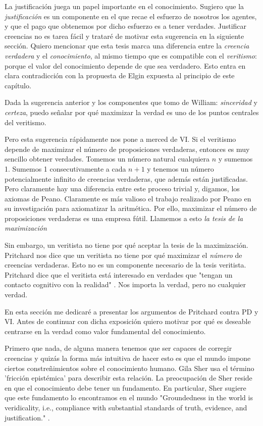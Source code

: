 La justificación juega un papel importante en el conocimiento.
Sugiero que la \emph{justificación} es un componente en el que recae el esfuerzo de nosotros los agentes, y que el pago que obtenemos por dicho esfuerzo es a tener verdades.
Justificar creencias no es tarea fácil y trataré de motivar esta sugerencia en la siguiente sección.
Quiero mencionar que esta tesis marca una diferencia entre la \emph{creencia verdadera} y el \emph{conocimiento}, al mismo tiempo que es compatible con el \emph{veritismo}: porque el valor del conocimiento depende de que sea verdadero.
Esto entra en clara contradicción con la propuesta de Elgin expuesta al principio de este capítulo.

Dada la sugerencia anterior y los componentes que tomo de William: \emph{sinceridad} y \emph{certeza}, puedo señalar por qué maximizar la verdad es uno de los puntos centrales del veritismo.

Pero esta sugerencia rápidamente nos pone a merced de VI.
Si el veritismo depende de maximizar el número de proposiciones verdaderas, entonces es muy sencillo obtener verdades.
Tomemos un número natural cualquiera $n$ y sumemos 1.
Sumemos 1 consecutivamente a cada $n+1$ y tenemos un número potencialmente infinito de creencias verdaderas, que además están justificadas.
Pero claramente hay una diferencia entre este proceso trivial y, digamos, los axiomas de Peano.
Claramente es más valioso el trabajo realizado por Peano en su investigación para axiomatizar la aritmética.
Por ello, maximizar el número de proposiciones verdaderas es una empresa fútil.
Llamemos a esto \emph{la tesis de la maximización}

Sin embargo, un veritista no tiene por qué aceptar la tesis de la maximización. Pritchard nos dice que un veritista no tiene por qué maximizar el \emph{número} de creencias verdaderas.
Esto no es un componente necesario de la tesis veritista.
Pritchard dice que el veritista está interesado en verdades que "tengan un contacto cognitivo con la realidad" \parencite{pritchardEpistemicValueCognitive2021}.
Nos importa la verdad, pero no cualquier verdad. 

En esta sección me dedicaré a presentar los argumentos de Pritchard contra PD y VI. Antes de continuar con dicha exposición quiero motivar por qué es deseable centrarse en la verdad como valor fundamental del conocimiento.

Primero que nada, de alguna manera tenemos que ser capaces de corregir creencias y quizás la forma más intuitiva de hacer esto es que el mundo impone ciertos constreñimientos sobre el conocimiento humano.
Gila Sher usa el término 'fricción epistémica' para describir esta relación.
La preocupación de Sher reside en que el conocimiento debe tener un fundamento.
En particular, Sher sugiere que este fundamento lo encontramos en el mundo "Groundedness in the world is veridicality, i.e., compliance with substantial standards of truth, evidence, and justification." \parencite[][p. 9]{sher2016}.

